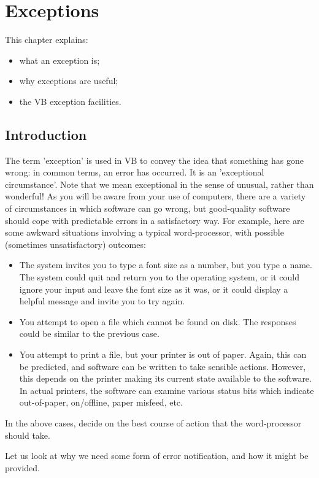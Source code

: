 \chapter{Exceptions}
	\label{ch:exceptions}

	This chapter explains:
	\begin{itemize}
    \item what an exception is;
    \item why exceptions are useful;
    \item the VB exception facilities.
	\end{itemize}


	\section{Introduction}
		The term 'exception' is used in VB to convey the idea that something has gone wrong: in common terms, an error has occurred. It is an 'exceptional circumstance'. Note that we mean exceptional in the sense of unusual, rather than wonderful! As you will be aware from your use of computers, there are a variety of circumstances in which software can go wrong, but good-quality software should cope with predictable errors in a satisfactory way. For example, here are some awkward situations involving a typical word-processor, with possible (sometimes unsatisfactory) outcomes:
		\begin{itemize}
      \item The system invites you to type a font size as a number, but you type a name. The system could quit and return you to the operating system, or it could ignore your input and leave the font size as it was, or it could display a helpful message and invite you to try again.
      \item You attempt to open a file which cannot be found on disk. The responses could be similar to the previous case.
      \item You attempt to print a file, but your printer is out of paper. Again, this can be predicted, and software can be written to take sensible actions. However, this depends on the printer making its current state available to the software. In actual printers, the software can examine various status bits which indicate out-of-paper, on/offline, paper misfeed, etc.
		\end{itemize}

		\begin{stqb}
			\begin{STQ}
			\item	In the above cases, decide on the best course of action that the word-processor should take.
			\end{STQ}
		\end{stqb}
		Let us look at why we need some form of error notification, and how it might be provided.
		
